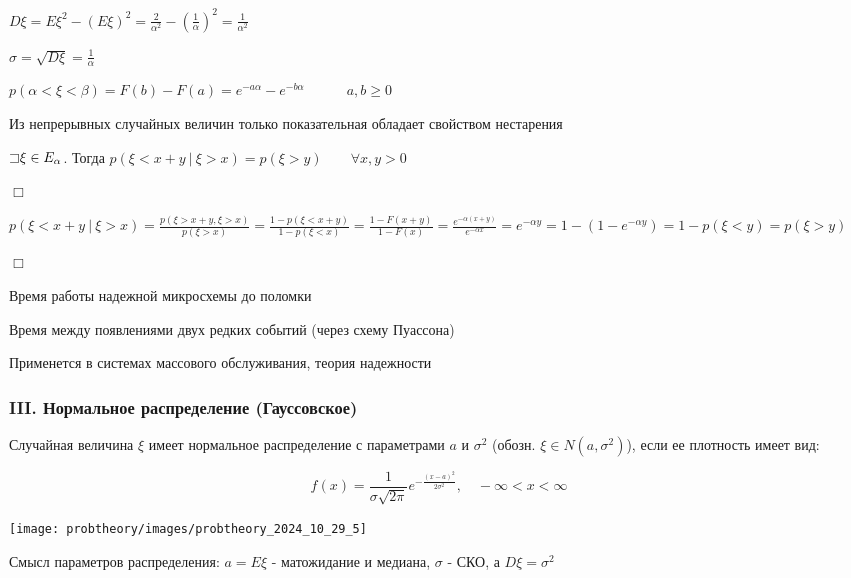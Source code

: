 \documentclass[12pt]{article}
\begin{document}
    $D\xi = E\xi^2 - (E\xi)^2 = \frac{2}{\alpha^2} - \left(\frac{1}{\alpha}\right)^2 = \frac{1}{\alpha^2}$
    
    $\sigma = \sqrt{D\xi} = \frac{1}{\alpha}$

    $p(\alpha < \xi < \beta) = F(b) - F(a) = e^{-a\alpha} - e^{-b\alpha} \quad\quad\quad a, b \geq 0$

    \Nota Из непрерывных случайных величин только показательная обладает свойством нестарения

    \begin{MyTheorem}
        \Ths $\mathord{\sqsupset} \xi \in E_\alpha$. Тогда $p(\xi < x + y \ | \ \xi > x) = p(\xi > y) \quad\quad \forall x, y > 0$
    \end{MyTheorem}

    \begin{MyProof}
        $\Box$

        $p(\xi < x + y \ | \ \xi > x) = \frac{p(\xi > x + y, \xi > x)}{p(\xi > x)} = \frac{1 - p(\xi < x + y)}{1 - p(\xi < x)} = 
        \frac{1 - F(x + y)}{1 - F(x)} = \frac{e^{-\alpha(x + y)}}{e^{-\alpha x}} = e^{-\alpha y} = 1 - (1 - e^{-\alpha y}) = 1 - p(\xi < y) = p(\xi > y)$

        $\Box$
    \end{MyProof}

     Время работы надежной микросхемы до поломки

     Время между появлениями двух редких событий (через схему Пуассона)

    \Notas Применется в системах массового обслуживания, теория надежности

    \hypertarget{normaldistribution}{}

    \subsubsection{III. Нормальное распределение (Гауссовское)}

    \Def Случайная величина $\xi$ имеет нормальное распределение с параметрами $a$ и $\sigma^2$ (обозн. $\xi \in N(a, \sigma^2)$), если
    ее плотность имеет вид:

    \[f(x) = \frac{1}{\sigma \sqrt{2\pi}} e^{-\frac{(x - a)^2}{2\sigma^2}}, \quad -\infty < x < \infty\]

    \texttt{[image: probtheory/images/probtheory\_2024\_10\_29\_5]}

    Смысл параметров распределения: $a = E\xi$ - матожидание и медиана, $\sigma$ - СКО, а $D\xi = \sigma^2$
\end{document}

